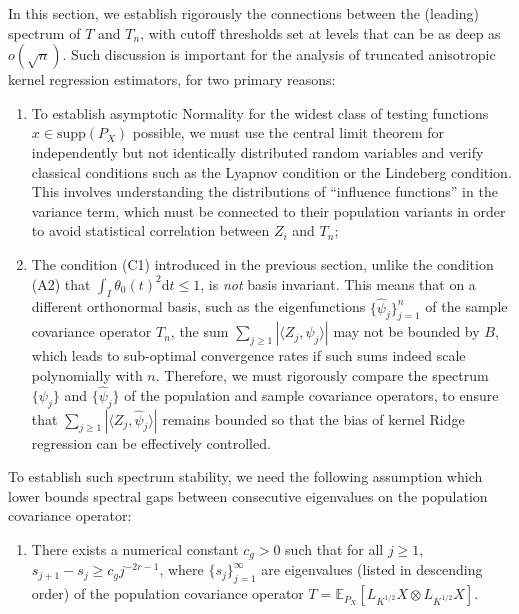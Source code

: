 \documentclass[11pt,a4paper]{article}
\renewcommand{\hat}{\widehat}
\theoremstyle{definition}
\theoremstyle{plain}
\theoremstyle{remark}
\newcommand{\supp}{\mathrm{supp}}
\newcommand{\ud}{\mathrm d}
\begin{document}
In this section, we establish rigorously the connections between the (leading) spectrum of $T$ and $T_n$,
with cutoff thresholds set at levels that can be as deep as $o(\sqrt{n})$. Such discussion is important for the analysis of truncated anisotropic kernel regression estimators, for two primary reasons:
\begin{enumerate}
\item To establish asymptotic Normality for the widest class of testing functions $x\in\supp(P_X)$ possible, we must use the central limit theorem for independently but not identically distributed random variables
and verify classical conditions such as the Lyapnov condition or the Lindeberg condition. This involves understanding the distributions of ``influence functions'' in the variance term, which must be connected to
their population variants in order to avoid statistical correlation between $Z_i$ and $T_n$;
\item The condition (C1) introduced in the previous section, unlike the condition (A2) that $\int_I \theta_0(t)^2\ud t\leq 1$, is \emph{not} basis invariant. This means that on a different orthonormal basis,
such as the eigenfunctions $\{\hat\psi_j\}_{j=1}^n$ of the sample covariance operator $T_n$, the sum $\sum_{j\geq 1}|\langle Z_j,\hat\psi_j\rangle|$ may not be bounded by $B$,
which leads to sub-optimal convergence rates if such sums indeed scale polynomially with $n$.
Therefore, we must rigorously compare the spectrum $\{\psi_j\}$ and $\{\hat\psi_j\}$ of the population and sample covariance operators,
to ensure that $\sum_{j\geq 1}|\langle Z_j,\hat\psi_j\rangle|$ remains bounded so that the bias of kernel Ridge regression can be effectively controlled.
\end{enumerate}

To establish such spectrum stability, we need the following assumption which lower bounds spectral gaps between consecutive eigenvalues on the population covariance operator:
\begin{enumerate}
\item[(D1)] There exists a numerical constant $c_g>0$ such that for all $j\geq 1$, $s_{j+1}-s_j\geq c_g j^{-2r-1}$, where $\{s_j\}_{j=1}^{\infty}$ are eigenvalues (listed in descending order) of the population covariance operator $T=\mathbb E_{P_X}[L_{K^{1/2}}X\otimes L_{K^{1/2}}X]$.
\end{enumerate}
\end{document}
